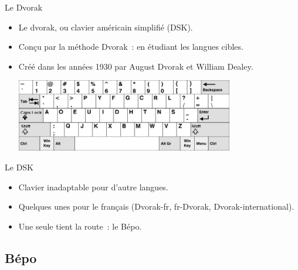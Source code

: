 \begin{frame}{Le Dvorak}
    \begin{itemize}
	\item Le dvorak, ou clavier américain simplifié (DSK). \pause

	\item Conçu par la méthode Dvorak~: en étudiant les langues
          cibles. \pause

	\item Créé dans les années 1930 par August Dvorak et William Dealey. \pause

	  \includegraphics[height=90pt]{images/dvorak.png}
    \end{itemize}
\end{frame}

\begin{frame}{Le DSK}
    \begin{itemize}
	\item Clavier inadaptable pour d’autre langues. \pause

	\item Quelques unes pour le français (Dvorak-fr, fr-Dvorak,
          Dvorak-international). \pause

	\item Une seule tient la route~: le Bépo. \pause
    \end{itemize}
\end{frame}



\subsection{Bépo}

